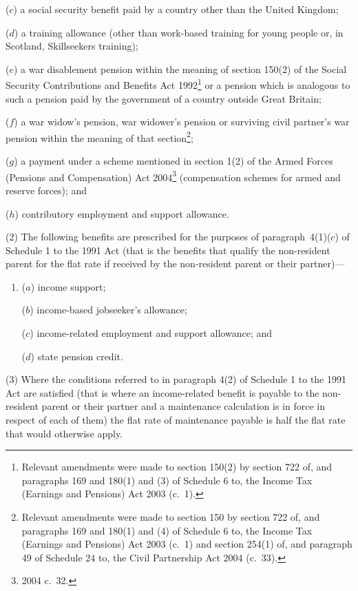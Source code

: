 \documentclass[12pt,a4paper]{article}
\begin{document}
\begin{enumerate}
($c$) a social security benefit paid by a country other than the United Kingdom;

($d$) a training allowance (other than work-based training for young people or, in Scotland, Skillseekers training);

($e$) a war disablement pension within the meaning of section 150(2) of the Social Security Contributions and Benefits Act 1992\footnote{Relevant amendments were made to section 150(2) by section 722 of, and paragraphs 169 and 180(1) and (3) of Schedule 6 to, the Income Tax (Earnings and Pensions) Act 2003 (c.~1).} or a pension which is analogous to such a pension paid by the government of a country outside Great Britain;

($f$) a war widow’s pension, war widower’s pension or surviving civil partner’s war pension within the meaning of that section\footnote{Relevant amendments were made to section 150 by section 722 of, and paragraphs 169 and 180(1) and (4) of Schedule 6 to, the Income Tax (Earnings and Pensions) Act 2003 (c.~1) and section 254(1) of, and paragraph 49 of Schedule 24 to, the Civil Partnership Act 2004 (c.~33).};

($g$) a payment under a scheme mentioned in section 1(2) of the Armed Forces (Pensions and Compensation) Act 2004\footnote{2004 c.~32.} (compensation schemes for armed and reserve forces); and

($h$) contributory employment and support allowance.
\end{enumerate}

\begin{sloppypar}
(2) The following benefits are prescribed for the purposes of paragraph~4(1)($c$)  of Schedule 1 to the 1991 Act (that is the benefits that qualify the non-resident parent for the flat rate if received by the non-resident parent or their partner)—
\end{sloppypar}
\begin{enumerate}\item[]
($a$) income support;

($b$) income-based jobseeker’s allowance;

($c$) income-related employment and support allowance; and

($d$) state pension credit.
\end{enumerate}

(3) Where the conditions referred to in paragraph 4(2) of Schedule 1 to the 1991 Act are satisfied (that is where an income-related benefit is payable to the non-resident parent or their partner and a maintenance calculation is in force in respect of each of them) the flat rate of maintenance payable is half the flat rate that would otherwise apply.
\end{document}
